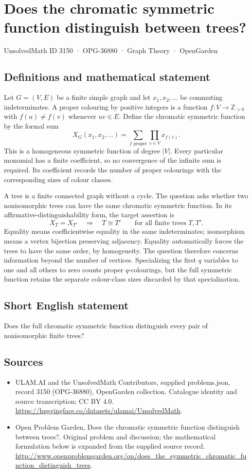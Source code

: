 \documentclass[11pt,a4paper]{article}
\begin{document}
\section*{Does the chromatic symmetric function distinguish between trees?}\label{3150}
{\small UnsolvedMath ID 3150 · OPG-36880 · Graph Theory · OpenGarden}
\subsection{Definitions and mathematical statement}
Let $G=(V,E)$ be a finite simple graph and let
$x_1,x_2,\ldots$ be commuting indeterminates. A proper colouring by
positive integers is a function $f:V\to\mathbb Z_{>0}$ with
$f(u)\neq f(v)$ whenever $uv\in E$. Define the chromatic symmetric
function by the formal sum
\[
 X_G(x_1,x_2,\ldots)
   =\sum_{f\text{ proper}}\prod_{v\in V}x_{f(v)}.
\]
This is a homogeneous symmetric function of degree $|V|$. Every
particular monomial has a finite coefficient, so no convergence
of the infinite sum is required. Its coefficient records the
number of proper colourings with the corresponding sizes of
colour classes.

A tree is a finite connected graph without a cycle. The question
asks whether two nonisomorphic trees can have the same chromatic
symmetric function. In its affirmative-distinguishability form,
the target assertion is
\[
 X_T=X_{T'}\quad\Longrightarrow\quad T\cong T'
 \qquad\text{for all finite trees }T,T'.
\]
Equality means coefficientwise equality in the same indeterminates;
isomorphism means a vertex bijection preserving adjacency. Equality
automatically forces the trees to have the same order, by
homogeneity. The question therefore concerns information beyond
the number of vertices. Specializing the first $q$ variables to
one and all others to zero counts proper $q$-colourings, but the
full symmetric function retains the separate colour-class sizes
discarded by that specialization.
\subsection{Short English statement}
Does the full chromatic symmetric function distinguish every pair of nonisomorphic finite trees?
\subsection{Sources}
\begin{itemize}
\item[S1] ULAM.AI and the UnsolvedMath Contributors, supplied problems.json, record 3150 (OPG-36880), OpenGarden collection. Catalogue identity and source transcription; CC BY 4.0.
\url{https://huggingface.co/datasets/ulamai/UnsolvedMath}.
\item[S2] Open Problem Garden, Does the chromatic symmetric function distinguish between trees?. Original problem and discussion; the mathematical formulation below is expanded from the supplied source record.
\url{http://www.openproblemgarden.org/op/does_the_symmetric_chromatic_function_distinguish_trees}.
\end{itemize}
\end{document}
